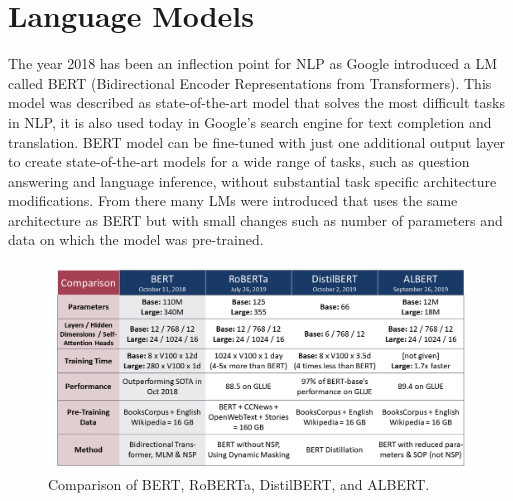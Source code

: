 \documentclass[10pt, english]{report}
\begin{document}
\begin{table}[htp]
\centering
{}
\vspace{0.4cm}
\caption{Dataset split sizes for SUPPORTS, REFUTES and NOTENOUGHINFO (NEI) classes.}
\label{tab:fever_splits}
\end{table}

\section{Language Models}
The year 2018 has been an inflection point for NLP as Google introduced a LM called BERT (Bidirectional Encoder Representations from Transformers)\cite{devlin2018bert}. This model was described as state-of-the-art model that solves the most difficult tasks in NLP, it is also used today in Google's search engine for text completion and translation. BERT model can be fine-tuned with just one additional output layer to create state-of-the-art models for a wide range of tasks, such as question answering and language inference, without substantial task specific architecture modifications. From there many LMs were introduced that uses the same architecture as BERT but with small changes such as number of parameters and data on which the model was pre-trained.

\begin{figure}[htp]
    \centering
    \includegraphics[scale=0.4]{img/lm_compar.png}
    \caption[Comparison]{Comparison of BERT, RoBERTa, DistilBERT, and ALBERT. \footnotemark}
    \label{fig:lm_compar}
\end{figure}
\end{document}
